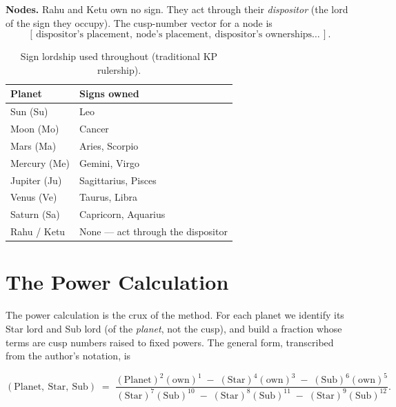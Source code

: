 \documentclass[11pt, a4paper]{article}
\begin{document}
\textbf{Nodes.} Rahu and Ketu own no sign. They act through their
\emph{dispositor} (the lord of the sign they occupy). The cusp-number vector
for a node is
\[
  [\,\text{dispositor's placement},\ \text{node's placement},\ \text{dispositor's ownerships}\ldots\,].
\]

\begin{table}[htbp]
  \centering
  \caption{Sign lordship used throughout (traditional KP rulership).}
  \label{tab:lordship}
  \begin{tabularx}{0.92\textwidth}{l X}
    \toprule
    Planet & Signs owned \\
    \midrule
    Sun (Su)     & Leo \\
    Moon (Mo)    & Cancer \\
    Mars (Ma)    & Aries, Scorpio \\
    Mercury (Me) & Gemini, Virgo \\
    Jupiter (Ju) & Sagittarius, Pisces \\
    Venus (Ve)   & Taurus, Libra \\
    Saturn (Sa)  & Capricorn, Aquarius \\
    Rahu / Ketu  & None --- act through the dispositor \\
    \bottomrule
  \end{tabularx}
\end{table}

\section{The Power Calculation}

The power calculation is the crux of the method. For each planet we identify
its Star lord and Sub lord (of the \emph{planet}, not the cusp), and build a
fraction whose terms are cusp numbers raised to fixed powers. The general form,
transcribed from the author's notation, is

\begin{equation}
  (\text{Planet},\ \text{Star},\ \text{Sub})
  \;=\;
  \frac{(\text{Planet})^{2}(\text{own})^{1}\;-\;(\text{Star})^{4}(\text{own})^{3}\;-\;(\text{Sub})^{6}(\text{own})^{5}}
       {(\text{Star})^{7}(\text{Sub})^{10}\;-\;(\text{Star})^{8}(\text{Sub})^{11}\;-\;(\text{Star})^{9}(\text{Sub})^{12}}.
  \label{eq:power}
\end{equation}
\end{document}
